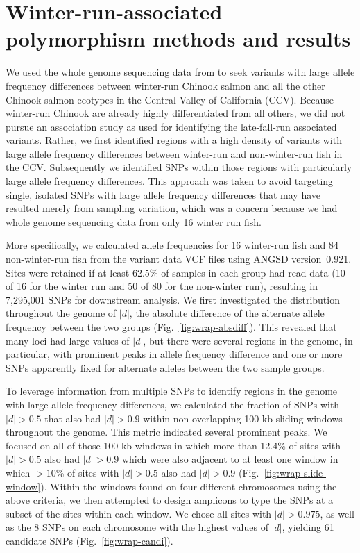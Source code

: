 
\section{Winter-run-associated polymorphism methods and results\label{sec:wrap-methods}}

We used the whole genome sequencing data from \citet{thompson2020complex} to seek variants with
large allele frequency differences between winter-run Chinook salmon and all the other
Chinook salmon ecotypes in the Central Valley of California (CCV).  Because winter-run Chinook are
already highly differentiated from all others, we did not pursue an association study as used
for identifying the late-fall-run associated variants.  Rather, we first identified regions with a high
density of variants with large allele frequency differences between winter-run and non-winter-run
fish in the CCV\@. Subsequently we identified SNPs within those regions with particularly
large allele frequency differences.  This approach was taken to avoid targeting single, isolated SNPs
with large allele frequency differences that may have resulted merely from sampling variation, which was a
concern because we had whole genome sequencing data from only 16 winter run fish.

More specifically, we calculated allele frequencies for 16 winter-run fish and 84 non-winter-run
fish from the  \citet{thompson2020complex} variant data VCF files using ANGSD version~0.921.
Sites were retained if at least 62.5\% of samples in each group had read data (10 of 16 for the
winter run and 50 of 80 for the non-winter run), resulting in 7,295,001 SNPs for downstream
analysis.  We first investigated the distribution throughout the genome of $|d|$, the absolute difference
of the alternate allele frequency between the two groups  (Fig.~\ref{fig:wrap-absdiff}). This revealed
that many loci had large values of $|d|$, but there were several
regions in the genome, in particular, with prominent peaks in allele frequency difference and one
or more SNPs apparently fixed for alternate alleles between the two sample groups.  

To leverage information from multiple SNPs to identify regions in the genome with large
allele frequency differences, we calculated the fraction of SNPs with $|d| > 0.5$ that also
had $|d| > 0.9$ within non-overlapping 100 kb sliding windows throughout the genome. This metric indicated
several prominent peaks.  We focused on all of those
100 kb windows in which more than 12.4\% of sites with $|d|>0.5$ also had $|d|>0.9$ which were
also adjacent to at least one window in which $>10\%$ of sites with $|d|>0.5$ also had $|d|>0.9$ 
(Fig.~\ref{fig:wrap-slide-window}).  Within the windows found on four different chromosomes using
the above criteria, we then attempted to design amplicons to type the SNPs at a subset of the sites
within each window.  We chose all sites with $|d|>0.975$, as well as the 8 SNPs on each chromosome
with the highest values of $|d|$, yielding 61 candidate SNPs (Fig.~\ref{fig:wrap-candi}).  

